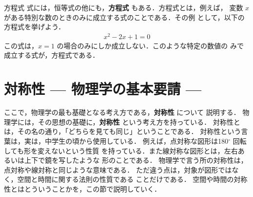             \begin{memo}{方程式}
                式には，恒等式の他にも，\textbf{方程式} もある．方程式とは，例えば，
                変数 $x$ がある特別な数のときのみに成立する式のことである．その例
                として，以下の方程式を挙げよう．
                    \begin{align}
                        x^{2} - 2x + 1 = 0
                    \end{align}
                この式は，$x=1$ の場合のみにしか成立しない．このような特定の数値の
                みで成立する式が，方程式である．
            \end{memo}


    \section{対称性 --- 物理学の基本要請 ---}
    \begin{mycomment}
        ここで，物理学の最も基礎となる考え方である，\textbf{対称性} について
        説明する．
        物理学には，その思想の基礎に，\textbf{対称性} という考え方を持っている．
        対称性とは，その名の通り，「どちらを見ても同じ」ということである．
        対称性という言葉は，実は，中学生の頃から使用している．
        例えば，点対称な図形は180${}^{\circ}$ 回転しても形を変えないという性質
        を持っている．また線対称な図形とは，左右あるいは上下で鏡を写したような
        形のことである．
        物理学で言う所の対称性は，点対称や線対称と同じような意味である．
        ただ違う点は，対象が図形ではなく，空間と時間に関する法則の性質である
        ことだけである．
        空間や時間の対称性とはとういうことかを，この節で説明していく．
    \end{mycomment}

